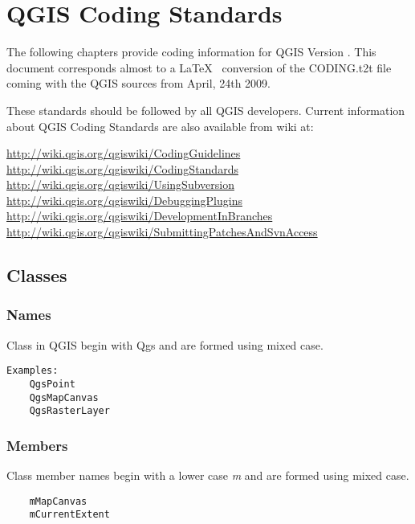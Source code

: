 
\section{QGIS Coding Standards}


The following chapters provide coding information for QGIS Version \CURRENT. 
This document corresponds almost to a \LaTeX~ conversion of
the CODING.t2t file coming with the QGIS sources from April, 24th 2009.

These standards should be followed by all QGIS developers. Current information 
about QGIS Coding Standards are also available from wiki at:

\url{http://wiki.qgis.org/qgiswiki/CodingGuidelines} \\
\url{http://wiki.qgis.org/qgiswiki/CodingStandards} \\
\url{http://wiki.qgis.org/qgiswiki/UsingSubversion} \\
\url{http://wiki.qgis.org/qgiswiki/DebuggingPlugins} \\
\url{http://wiki.qgis.org/qgiswiki/DevelopmentInBranches} \\
\url{http://wiki.qgis.org/qgiswiki/SubmittingPatchesAndSvnAccess} \\

\subsection{Classes}
\subsubsection{Names}
Class in QGIS begin with Qgs and are formed using mixed case. 

\begin{verbatim}
Examples:
	QgsPoint
	QgsMapCanvas
	QgsRasterLayer
\end{verbatim}

\subsubsection{Members}
Class member names begin with a lower case \textit{m} and are formed using mixed case.

\begin{verbatim}
	mMapCanvas	
	mCurrentExtent
\end{verbatim}

